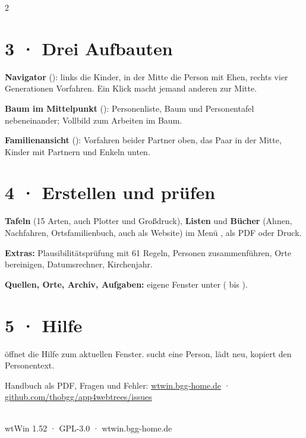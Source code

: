 \documentclass[a4paper, 9.5pt, parskip=half]{scrartcl}
\begin{document}
\begin{multicols}{2}
\section*{3 · Drei Aufbauten}
\textbf{Navigator} (): links die Kinder, in der Mitte die Person mit Ehen, rechts vier Generationen Vorfahren. Ein Klick macht jemand anderen zur Mitte.

\textbf{Baum im Mittelpunkt} (): Personenliste, Baum und Personentafel nebeneinander; Vollbild zum Arbeiten im Baum.

\textbf{Familienansicht} (): Vorfahren beider Partner oben, das Paar in der Mitte, Kinder mit Partnern und Enkeln unten.
\section*{4 · Erstellen und prüfen}
\textbf{Tafeln} (15 Arten, auch Plotter und Großdruck), \textbf{Listen} und \textbf{Bücher} (Ahnen, Nachfahren, Ortsfamilienbuch, auch als Website) im Menü , als PDF oder Druck.

\textbf{Extras:} Plausibilitätsprüfung mit 61 Regeln, Personen zusammenführen, Orte bereinigen, Datumsrechner, Kirchenjahr.

\textbf{Quellen, Orte, Archiv, Aufgaben:} eigene Fenster unter  ( bis ).
\section*{5 · Hilfe}
 öffnet die Hilfe zum aktuellen Fenster.  sucht eine Person,  lädt neu,  kopiert den Personentext.

Handbuch als PDF, Fragen und Fehler: \href{https://wtwin.bgg-home.de}{wtwin.bgg-home.de} · \href{https://github.com/thobgg/app4webtrees/issues}{github.com/thobgg/app4webtrees/issues}
\vspace{3mm}
\noindent{}
\end{multicols}
\vspace{2mm}
\noindent{\color{wtLinie}\rule{\linewidth}{0.5pt}}\\[2pt]
{\sffamily\footnotesize\color{wtGrau}wtWin 1.52 · GPL-3.0 · wtwin.bgg-home.de}
\end{document}
